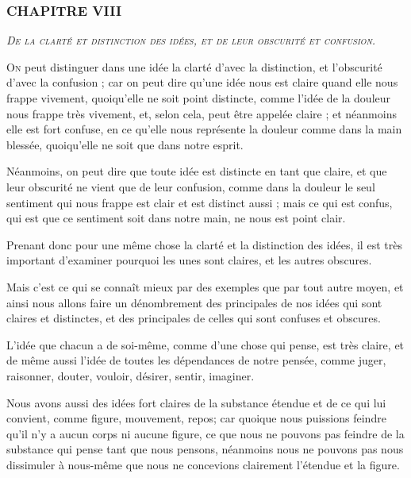 \subsubsection{\centering \Large CHAPITRE VIII}
\begin{center}\emph{\large\scshape De la clarté et distinction des idées, et de leur obscurité et confusion.}\end{center}

	\lettrine{O}{n} peut distinguer dans une idée la clarté d'avec la distinction, et l'obscurité d'avec la confusion ; car on peut dire qu'une idée nous est claire quand elle nous frappe vivement, quoiqu'elle ne soit point distincte, comme l'idée de la douleur nous frappe très vivement, et, selon cela, peut être appelée claire ; et néanmoins elle est fort confuse, en ce qu'elle nous représente la douleur comme dans la main blessée, quoiqu'elle ne soit que dans notre esprit.

Néanmoins, on peut dire que toute idée est distincte en tant que claire, et que leur obscurité ne vient que de leur confusion, comme dans la douleur le seul sentiment qui nous frappe est clair et est distinct aussi ; mais ce qui est confus, qui est que ce sentiment soit dans notre main, ne nous est point clair.

Prenant donc pour une même chose la clarté et la distinction des idées, il est très important d'examiner pourquoi les unes sont claires, et les autres obscures.

Mais c'est ce qui se connaît mieux par des exemples que par tout autre moyen, et ainsi nous allons faire un dénombrement des principales de nos idées qui sont claires et distinctes, et des principales de celles qui sont confuses et obscures.

L'idée que chacun a de soi-même, comme d'une chose qui pense, est très claire, et de même aussi l'idée de toutes les dépendances de notre pensée, comme juger, raisonner, douter, vouloir, désirer, sentir, imaginer.

Nous avons aussi des idées fort claires de la substance étendue et de ce qui lui convient, comme figure, mouvement, repos; car quoique nous puissions feindre qu'il n'y a aucun corps ni aucune figure, ce que nous ne pouvons pas feindre de la substance qui pense tant que nous pensons, néanmoins nous ne pouvons pas nous dissimuler à nous-même que nous ne concevions clairement l'étendue et la figure.

